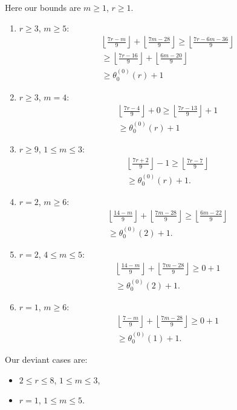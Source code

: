 \documentclass[reqno]{amsart}
\theoremstyle{definition}
\theoremstyle{remark}
\numberwithin{equation}{section}
\begin{document}
Here our bounds are $m\ge 1$, $r\ge 1$.\\

\begin{enumerate}
\item $r\ge 3$, $m\ge 5$:
\begin{align*}
&\left\lfloor \frac{7r-m}{9} \right\rfloor + \left\lfloor \frac{7m-28}{9} \right\rfloor\ge \left\lfloor \frac{7r-6m-36}{9} \right\rfloor\\
&\ge\left\lfloor \frac{7r-16}{9} \right\rfloor + \left\lfloor \frac{6m-20}{9} \right\rfloor\\
&\ge\theta^{(0)}_0(r)+1
\end{align*}
\item $r\ge 3$, $m=4$:
\begin{align*}
&\left\lfloor \frac{7r-4}{9} \right\rfloor + 0\ge \left\lfloor \frac{7r-13}{9} \right\rfloor + 1\\
&\ge\theta^{(0)}_0(r)+1
\end{align*}
\item $r\ge 9$, $1\le m\le 3$:
\begin{align*}
&\left\lfloor \frac{7r+2}{9} \right\rfloor -1 \ge \left\lfloor \frac{7r-7}{9} \right\rfloor\\
&\ge\theta^{(0)}_0(r)+1.
\end{align*}
\item $r=2$, $m\ge 6$:
\begin{align*}
&\left\lfloor \frac{14-m}{9} \right\rfloor + \left\lfloor \frac{7m-28}{9} \right\rfloor\ge\left\lfloor \frac{6m-22}{9} \right\rfloor \\
&\ge\theta^{(0)}_0(2)+1.
\end{align*}
\item $r=2$, $4\le m\le 5$:
\begin{align*}
&\left\lfloor \frac{14-m}{9} \right\rfloor + \left\lfloor \frac{7m-28}{9} \right\rfloor \ge 0 + 1 \\
&\ge\theta^{(0)}_0(2)+1.
\end{align*}
\item $r=1$, $m\ge 6$:
\begin{align*}
&\left\lfloor \frac{7-m}{9} \right\rfloor + \left\lfloor \frac{7m-28}{9} \right\rfloor \ge 0 + 1 \\
&\ge\theta^{(0)}_0(1)+1.
\end{align*}
\end{enumerate}  Our deviant cases are:

\begin{itemize}
\item $2\le r\le 8$, $1\le m\le 3$,
\item $r=1$, $1\le m\le 5$.
\end{itemize}
\end{document}
